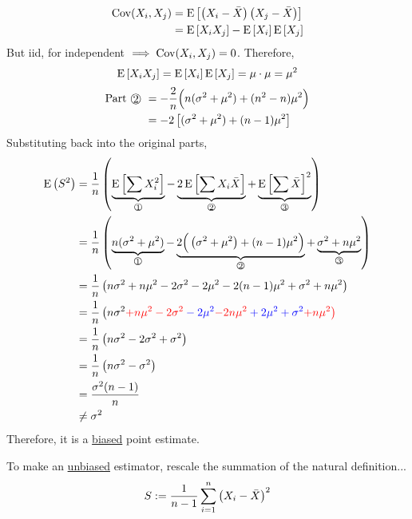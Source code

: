 \recall
\begin{align*}
    \Cov(X_i,X_j) &= \Eb{\pars{X_i - \Xbar}\pars{X_j - \Xbar}} \\
    &= \Eb{X_iX_j} - \Eb{X_i}\Eb{X_j} 
\end{align*}
But iid,  for independent $\implies \operatorname{Cov}(X_i, X_j) = 0$. Therefore,
$$\Eb{X_i X_j} = \Eb{X_i}\Eb{X_j} = \mu \cdot \mu = \mu^2$$
\begin{align*}
    \text{Part \cir{2} } &= -\frac{2}{n}\Big(n(\sigma^2 + \mu^2) + (n^2 - n)\mu^2\Big)\\
    &= -2\brac{(\sigma^2+\mu^2) + (n-1)\mu^2}
\end{align*}
Substituting back into the original parts,
\begin{align*}
    \E{S^2} &= \over{n}\pars{\underbrace{\Eb{\sum X_i^2}}_{\text{\cir{1}}} - \underbrace{2\Eb{\sum X_i\Xbar}}_{\text{\cir{2}}} + \underbrace{\Eb{\sum \Xbar}^2}_{\text{\cir{3}}}} \\
    &= \over{n}\pars{\underbrace{n(\sigma^2+\mu^2)}_{\text{\cir{1}}} - \underbrace{2\Big( \pars{\sigma^2 + \mu^2} + (n-1)\mu^2 \Big) }_{\text{\cir{2}}} + \underbrace{\sigma^2 + n\mu^2}_{\text{\cir{3}}}} \\
    &= \over{n}\pars{n\sigma^2+n\mu^2 -2\sigma^2 -2\mu^2 -2(n-1)\mu^2+ \sigma^2 + n\mu^2} \\
    &= \over{n}\pars{n\sigma^2\color{red}{+n\mu^2} -2\sigma^2 \color{blue} -2\mu^2 \color{red}{-2n\mu^2} \color{blue} + 2\mu^2 + \sigma^2 \color{red}{+n\mu^2}} \\
    &= \over{n}\pars{n\sigma^2 -2\sigma^2 + \sigma^2} \\
    &= \over{n}\pars{n\sigma^2 -\sigma^2} \\
    &= \frac{\sigma^2(n-1)}{n} \\
    &\neq \sigma^2 
\end{align*}
Therefore, it is a \underline{biased} point estimate.

\nl To make an \underline{unbiased} estimator, rescale the summation of the natural definition...
$$S := \over{n-1} \sum_{i=1}^n \pars{X_i - \Xbar}^2$$